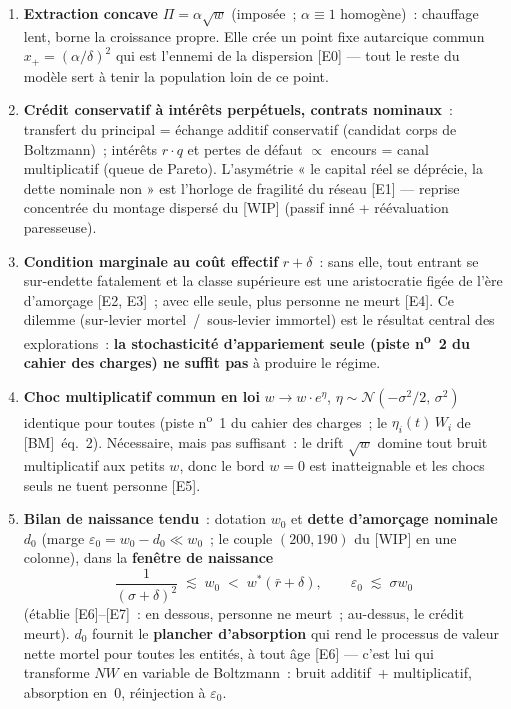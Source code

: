 \documentclass[11pt,a4paper]{article}
\newcommand{\NW}{\mathit{NW}}
\begin{document}
\begin{enumerate}
  \item \textbf{Extraction concave} $\Pi = \alpha\sqrt{w}$ (imposée~; $\alpha \equiv 1$ homogène)~: chauffage lent, borne la croissance propre. Elle crée un point fixe autarcique commun $x_+ = (\alpha/\delta)^2$ qui est l'ennemi de la dispersion [E0] --- tout le reste du modèle sert à tenir la population loin de ce point.
  \item \textbf{Crédit conservatif à intérêts perpétuels, contrats nominaux}~: transfert du principal = échange additif conservatif (candidat corps de Boltzmann)~; intérêts $r\cdot q$ et pertes de défaut $\propto$ encours = canal multiplicatif (queue de Pareto). L'asymétrie « le capital réel se déprécie, la dette nominale non » est l'horloge de fragilité du réseau [E1] --- reprise concentrée du montage dispersé du [WIP] (passif inné + réévaluation paresseuse).
  \item \textbf{Condition marginale au coût effectif} $r+\delta$~: sans elle, tout entrant se sur-endette fatalement et la classe supérieure est une aristocratie figée de l'ère d'amorçage [E2, E3]~; avec elle seule, plus personne ne meurt [E4]. Ce dilemme (sur-levier mortel~/~sous-levier immortel) est le résultat central des explorations~: \textbf{la stochasticité d'appariement seule (piste n\textsuperscript{o}~2 du cahier des charges) ne suffit pas} à produire le régime.
  \item \textbf{Choc multiplicatif commun en loi} $w \to w\cdot e^{\eta}$, $\eta \sim \mathcal N(-\sigma^2/2,\, \sigma^2)$ identique pour toutes (piste n\textsuperscript{o}~1 du cahier des charges~; le $\eta_i(t)\,W_i$ de [BM]~éq.~2). Nécessaire, mais pas suffisant~: le drift $\sqrt{w}$ domine tout bruit multiplicatif aux petits $w$, donc le bord $w=0$ est inatteignable et les chocs seuls ne tuent personne [E5].
  \item \textbf{Bilan de naissance tendu}~: dotation $w_0$ et \textbf{dette d'amorçage nominale} $d_0$ (marge $\varepsilon_0 = w_0 - d_0 \ll w_0$~; le couple $(200, 190)$ du [WIP] en une colonne), dans la \textbf{fenêtre de naissance}
  \[
    \frac{1}{(\sigma+\delta)^2} \;\lesssim\; w_0 \;<\; w^*(\bar r+\delta), \qquad \varepsilon_0 \;\lesssim\; \sigma w_0
  \]
  (établie [E6]--[E7]~: en dessous, personne ne meurt~; au-dessus, le crédit meurt). $d_0$ fournit le \textbf{plancher d'absorption} qui rend le processus de valeur nette mortel pour toutes les entités, à tout âge [E6] --- c'est lui qui transforme $\NW$ en variable de Boltzmann~: bruit additif~+ multiplicatif, absorption en~0, réinjection à $\varepsilon_0$.
\end{enumerate}
\end{document}
